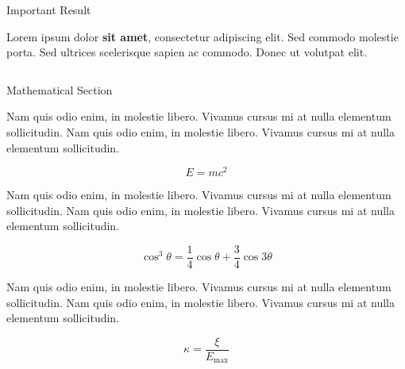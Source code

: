 \documentclass[final]{beamer}
\newlength{\onecolwid}
\newlength{\twocolwid}
\begin{document}
\begin{frame}[t]
\begin{columns}[t]
\begin{column}{\twocolwid}
\begin{alertblock}{Important Result}

Lorem ipsum dolor \textbf{sit amet}, consectetur adipiscing elit. Sed commodo molestie porta. Sed ultrices scelerisque sapien ac commodo. Donec ut volutpat elit.

\end{alertblock} 


\begin{columns}[t,totalwidth=\twocolwid] %

\begin{column}{\onecolwid} %


\begin{block}{Mathematical Section}

Nam quis odio enim, in molestie libero. Vivamus cursus mi at nulla elementum sollicitudin. Nam quis odio enim, in molestie libero. Vivamus cursus mi at nulla elementum sollicitudin.
  
\begin{equation}
E = mc^{2}
\label{eqn:Einstein}
\end{equation}

Nam quis odio enim, in molestie libero. Vivamus cursus mi at nulla elementum sollicitudin. Nam quis odio enim, in molestie libero. Vivamus cursus mi at nulla elementum sollicitudin.

\begin{equation}
\cos^3 \theta =\frac{1}{4}\cos\theta+\frac{3}{4}\cos 3\theta
\label{eq:refname}
\end{equation}

Nam quis odio enim, in molestie libero. Vivamus cursus mi at nulla elementum sollicitudin. Nam quis odio enim, in molestie libero. Vivamus cursus mi at nulla elementum sollicitudin.

\begin{equation}
\kappa =\frac{\xi}{E_{\mathrm{max}}} %
\end{equation}

\end{block}


\end{column}
\end{columns}
\end{column}
\end{columns}
\end{frame}
\end{document}
